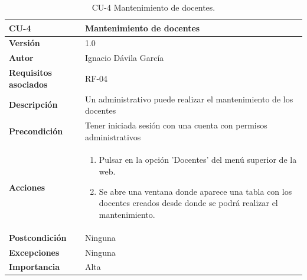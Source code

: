 \begin{table}[p]
	\centering
	\begin{tabularx}{\linewidth}{ p{} p{} }
		\toprule
		\textbf{CU-4}    & \textbf{Mantenimiento de docentes}\\
		\toprule
		\textbf{Versión}              & 1.0    \\
		\textbf{Autor}                & Ignacio Dávila García \\
		\textbf{Requisitos asociados} & RF-04 \\
		\textbf{Descripción}          & Un administrativo puede realizar el mantenimiento de los docentes \\
		\textbf{Precondición}         & Tener iniciada sesión con una cuenta con permisos administrativos \\
		\textbf{Acciones}             &
		\begin{enumerate}
			\def\labelenumi{\arabic{enumi}.}
			\tightlist
			\item Pulsar en la opción 'Docentes' del menú superior de la web.
			\item Se abre una ventana donde aparece una tabla con los docentes creados desde donde se podrá realizar el mantenimiento.
		\end{enumerate}\\
		\textbf{Postcondición}        & Ninguna \\
		\textbf{Excepciones}          & Ninguna \\
		\textbf{Importancia}          & Alta \\
		\bottomrule
	\end{tabularx}
	\caption{CU-4 Mantenimiento de docentes.}
\end{table}

